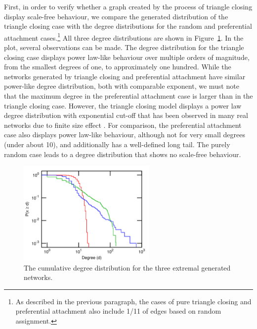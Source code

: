 \documentclass{jimis-final-en}
\begin{document}
First, in order to verify whether a graph created by the process of
triangle closing display scale-free behaviour,  
we compare the generated distribution of the triangle closing case with
the degree distributions for the random and preferential attachment
cases.\footnote{As described in the previous paragraph, the cases of pure
  triangle closing and preferential attachment also include 1/11 of
  edges based on random assignment.}  All three degree distributions are shown in
Figure~\ref{fig:comparison}.   
In the plot, several observations can be made.  The degree distribution
for the triangle closing case displays power law-like behaviour over
multiple orders of magnitude, from the smallest degrees of one, to
approximately one hundred.  
While the networks generated by triangle closing and preferential
attachment have similar power-like degree distribution, both with
comparable exponent, we must note that the maximum degree in the
preferential attachment case is larger than in the triangle closing
case. 
However, the triangle closing model displays a power law degree
distribution with exponential cut-off that has been observed in many
real networks due to finite size effect
\citep{boguna2004cut,clauset2009power}. 
For comparison, the
preferential attachment case also displays power law-like behaviour,
although not for very small degrees (under about 10), and additionally
has a well-defined long tail.  The purely random case leads to a degree
distribution that shows no scale-free behaviour.  

\begin{figure}
  \centering
  \includegraphics[width=0.6\textwidth]{comparison}
  \caption{
    \label{fig:comparison}
    The cumulative degree distribution for the three extremal generated
    networks. 
  }
\end{figure}
\end{document}
